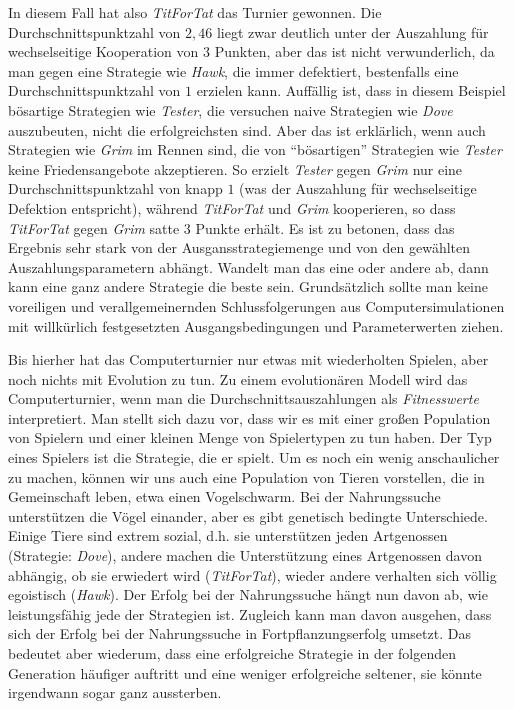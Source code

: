 In diesem Fall hat also {\em TitForTat} das Turnier gewonnen. Die
Durchschnittspunktzahl von $2,46$ liegt zwar deutlich unter der Auszahlung für
wechselseitige Kooperation von $3$ Punkten, aber das ist nicht verwunderlich,
da man gegen eine Strategie wie {\em Hawk}, die immer defektiert, bestenfalls
eine Durchschnittspunktzahl von $1$ erzielen kann. Auffällig ist, dass in
diesem Beispiel bösartige Strategien wie {\em Tester}, die versuchen naive
Strategien wie {\em Dove} auszubeuten, nicht die erfolgreichsten
sind. Aber das ist erklärlich, wenn auch Strategien wie {\em Grim} im Rennen
sind, die von "`bösartigen"' Strategien wie {\em Tester} keine Friedensangebote
akzeptieren. So erzielt {\em Tester} gegen {\em Grim} nur eine
Durchschnittspunktzahl von knapp $1$ (was der Auszahlung für wechselseitige
Defektion entspricht), während {\em TitForTat} und {\em Grim} kooperieren, so
dass {\em TitForTat} gegen {\em Grim} satte $3$ Punkte erhält. Es ist zu
betonen, dass das Ergebnis sehr stark von der Ausgansstrategiemenge und von den
gewählten Auszahlungsparametern abhängt. Wandelt man das eine oder andere ab,
dann kann eine ganz andere Strategie die beste sein. Grundsätzlich sollte man
keine voreiligen und verallgemeinernden Schlussfolgerungen aus
Computersimulationen mit willkürlich festgesetzten Ausgangsbedingungen und
Parameterwerten ziehen.

Bis hierher hat das Computerturnier nur etwas mit wiederholten Spielen, aber
noch nichts mit Evolution zu tun. Zu einem evolutionären Modell wird das
Computerturnier, wenn man die Durchschnittsauszahlungen als {\em Fitnesswerte}
interpretiert. Man stellt sich dazu vor, dass wir es mit einer großen
Population von Spielern und einer kleinen Menge von Spielertypen zu tun haben.
Der Typ eines Spielers ist die Strategie, die er spielt. Um es noch ein wenig
anschaulicher zu machen, können wir uns auch eine Population von Tieren
vorstellen, die in Gemeinschaft leben, etwa einen Vogelschwarm. Bei der
Nahrungssuche unterstützen die Vögel einander, aber es gibt genetisch bedingte
Unterschiede. Einige Tiere sind extrem sozial, d.h. sie unterstützen jeden
Artgenossen (Strategie: {\em Dove}), andere machen die Unterstützung eines
Artgenossen davon abhängig, ob sie erwiedert wird ({\em TitForTat}), wieder
andere verhalten sich völlig egoistisch ({\em Hawk}). Der Erfolg bei der
Nahrungssuche hängt nun davon ab, wie leistungsfähig jede der Strategien ist.
Zugleich kann man davon ausgehen, dass sich der Erfolg bei der Nahrungssuche in
Fortpflanzungserfolg umsetzt. Das bedeutet aber wiederum, dass eine
erfolgreiche Strategie in der folgenden Generation häufiger auftritt und eine
weniger erfolgreiche seltener, sie könnte irgendwann sogar ganz aussterben.


